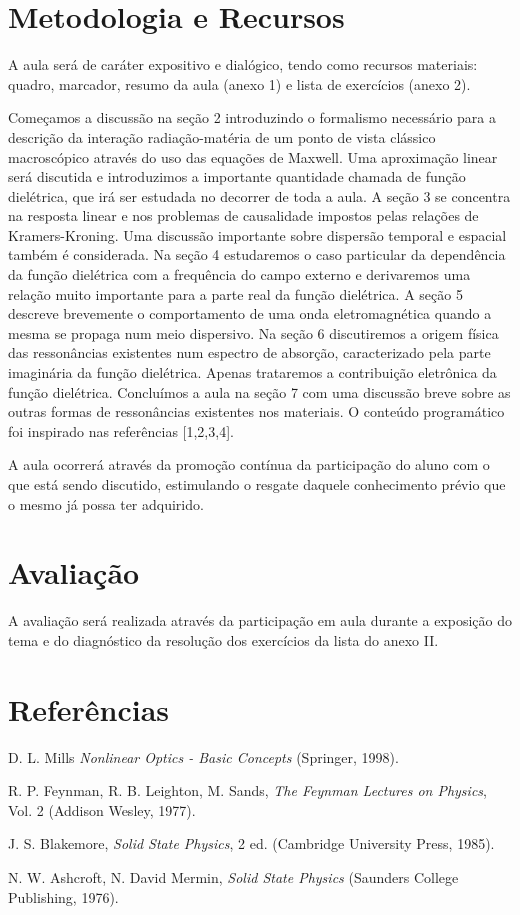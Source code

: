 \documentclass{article}
\begin{document}
\section{Metodologia e Recursos}

A aula será de caráter expositivo e dialógico, tendo como recursos materiais: quadro, marcador, resumo da aula (anexo 1) e lista de exercícios (anexo 2).

Começamos a discussão na seção 2 introduzindo o formalismo necessário para a descrição da interação radiação-matéria de um ponto de vista clássico macroscópico através do uso das equações de Maxwell. Uma aproximação linear será discutida e introduzimos a importante quantidade chamada de função dielétrica, que irá ser estudada no decorrer de toda a aula. A seção 3 se concentra na resposta linear e nos problemas de causalidade impostos pelas relações de Kramers-Kroning. Uma discussão importante sobre dispersão temporal e espacial também é considerada. Na seção 4 estudaremos o caso particular da dependência da função dielétrica com a frequência do campo externo e derivaremos uma relação muito importante para a parte real da função dielétrica. A seção 5 descreve brevemente o comportamento de uma onda eletromagnética quando a mesma se propaga num meio dispersivo. Na seção 6 discutiremos a origem física das ressonâncias existentes num espectro de absorção, caracterizado pela parte imaginária da função dielétrica. Apenas trataremos a contribuição eletrônica da função dielétrica. Concluímos a aula na seção 7 com uma discussão breve sobre as outras formas de ressonâncias existentes nos materiais. O conteúdo programático foi inspirado nas referências [1,2,3,4].

A aula ocorrerá através da promoção contínua da participação do aluno com o que está sendo discutido, estimulando o resgate daquele conhecimento prévio que o mesmo já possa ter adquirido.

\section{Avaliação}

A avaliação será realizada através da participação em aula durante a exposição do tema e do diagnóstico da resolução dos exercícios da lista do anexo II. 

\section{Referências}

\noindent [1] D. L. Mills \textit{Nonlinear Optics - Basic Concepts} (Springer, 1998).

\noindent [2] R. P. Feynman, R. B. Leighton, M. Sands, \textit{The Feynman Lectures on Physics}, Vol. 2 (Addison Wesley, 1977).

\noindent [3] J. S. Blakemore, \textit{Solid State Physics}, 2 ed. (Cambridge University Press, 1985).

\noindent [4] N. W. Ashcroft, N. David Mermin, \textit{Solid State Physics} (Saunders College Publishing, 1976).
\end{document}
